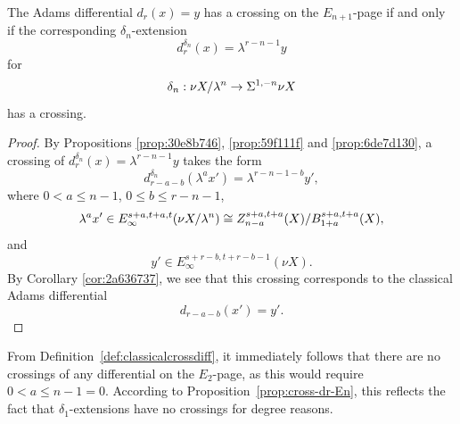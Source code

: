 \documentclass{amsart}
\numberwithin{equation}{section}
\begin{document}
\begin{proposition}\label{prop:cross-dr-En}
    The Adams differential $d_r(x)=y$ has a crossing on the $E_{n+1}$-page if and only if the corresponding $\delta_n$-extension
    $$d^{\delta_n}_r(x)=\lambda^{r-n-1}y$$
    for
    $$\delta_{n}:\nu X/\lambda^{n}\to \Sigma^{1,-n}\nu X$$
    has a crossing.
\end{proposition}
\begin{proof}
    By Propositions \ref{prop:30e8b746}, \ref{prop:59f111f} and \ref{prop:6de7d130}, a crossing of $d^{\delta_n}_r(x)=\lambda^{r-n-1}y$ takes the form
    $$d^{\delta_n}_{r-a-b}(\lambda^a x')=\lambda^{r-n-1-b}y',$$
    where $0<a\le n-1$, $0\le b\le r-n-1$, 
    $$\lambda^a x'\in E_\infty^{s+a,t+a,t}(\nu X/\lambda^n)\cong Z_{n-a}^{s+a,t+a}(X)/B_{1+a}^{s+a,t+a}(X),$$
    and
    $$y'\in E_\infty^{s+r-b, t+r-b-1}(\nu X).$$
    By Corollary \ref{cor:2a636737}, we see that this crossing corresponds to the classical Adams differential
    $$d_{r-a-b}(x')=y'.$$
\end{proof}

\begin{remark} \label{nocrossE2}
    From Definition~\ref{def:classicalcrossdiff}, it immediately follows that there are no crossings of any differential on the $E_2$-page, as this would require $0< a \le n-1 = 0$. According to Proposition~\ref{prop:cross-dr-En}, this reflects the fact that $\delta_1$-extensions have no crossings for degree reasons.
\end{remark}
\end{document}
